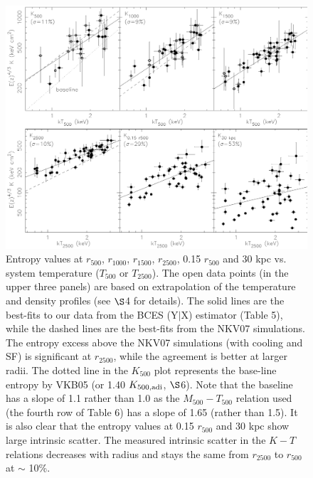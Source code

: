 \documentclass{aastex}
\begin{document}
\begin{figure}
\vspace{-5cm}
\centerline{\includegraphics[height=1.27\linewidth]{f11.ps}}
\vspace{-4.8cm} 
  \caption{Entropy values at $r_{500}$, $r_{1000}$, $r_{1500}$, $r_{2500}$,
0.15 $r_{500}$ and 30 kpc vs. system temperature ($T_{500}$ or $T_{2500}$).
The open data points (in the upper three panels) are based on extrapolation of
the temperature and density profiles (see $\S$4 for details).
The solid lines are the best-fits to our data from the BCES (Y$|$X) estimator (Table 5),
while the dashed lines are the best-fits from the NKV07 simulations.
The entropy excess above the NKV07 simulations (with cooling and SF) is
significant at $r_{2500}$, while the agreement is better at larger radii.
The dotted line in the $K_{500}$ plot represents the base-line entropy by
VKB05 (or 1.40 $K_{\rm 500, adi}$, $\S$6). Note that the baseline has a slope
of 1.1 rather than 1.0 as the $M_{500} - T_{500}$ relation used (the fourth row of
Table 6) has a slope of 1.65 (rather than 1.5).
It is also clear that the entropy values at 0.15 $r_{500}$ and 30 kpc
show large intrinsic scatter. The measured intrinsic scatter in the $K - T$
relations decreases with radius and stays the same from $r_{2500}$ to $r_{500}$ at
$\sim$ 10\%.
}
\end{figure}
\end{document}
